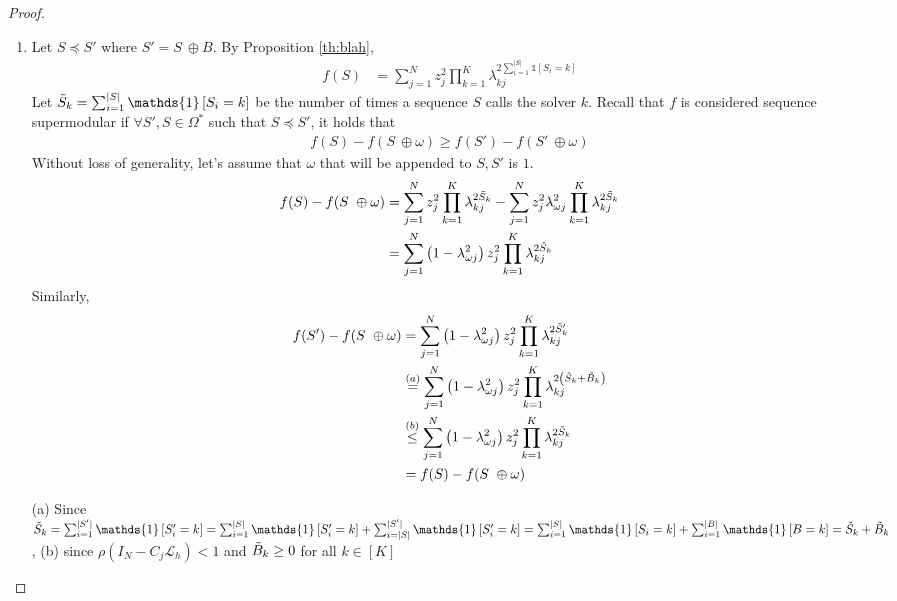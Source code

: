\documentclass[12pt]{article}
\begin{document}
\begin{proof}
\begin{enumerate}
\item[(ii)] Let $S \preceq S'$ where $S' = S \ \oplus B$. By Proposition \ref{th:blah},
\begin{align*}
    f(S) &= \sum_{j = 1}^N z_j^2 \prod_{k = 1}^K \lambda_{kj}^{2\sum_{i = 1}^{|S|} \mathds{1}\left[S_i = k\right]}
\end{align*}
Let $\Tilde{S}_k = \sum_{i = 1}^{|S|} \mathds{1}\left[S_i = k\right]$ be the number of times a sequence $S$ calls the solver $k$. Recall that $f$ is considered sequence supermodular if $\forall S', S \in \Omega^*$ such that $S \preceq S'$, it holds that
\begin{align*}
    f(S) - f(S \ \oplus \omega ) \geq f(S') - f(S' \ \oplus \omega )
\end{align*}
Without loss of generality, let's assume that $\omega$ that will be appended to $S, S'$ is $1$.
\begin{align*}
    f(S) - f(S \ \oplus \omega) &= \sum_{j = 1}^N z_j^2 \prod_{k = 1}^K \lambda_{kj}^{2\Tilde{S}_k} - \sum_{j = 1}^N z_j^2 \lambda_{\omega j}^{2}\prod_{k = 1}^K \lambda_{kj}^{2\Tilde{S}_k} \\
    &=  \sum_{j = 1}^N \left(1 - \lambda_{\omega j}^2\right) z_j^2 \prod_{k = 1}^K \lambda_{kj}^{2\Tilde{S}_k}
\end{align*}
Similarly, 
\begin{align*}
    f(S') - f(S \ \oplus \omega) &= \sum_{j = 1}^N \left(1 - \lambda_{\omega j}^2\right) z_j^2 \prod_{k = 1}^K \lambda_{kj}^{2\Tilde{S}'_k} \\
    &\overset{(a)}{=}  \sum_{j = 1}^N \left(1 - \lambda_{\omega j}^2\right) z_j^2 \prod_{k = 1}^K \lambda_{kj}^{2\left(\Tilde{S}_k + \Tilde{B}_k\right)} \\
    &\overset{(b)}{\leq } \sum_{j = 1}^N \left(1 - \lambda_{\omega j}^2\right) z_j^2 \prod_{k = 1}^K \lambda_{kj}^{2\Tilde{S}_k} \\
    &= f(S) - f(S \ \oplus \omega)
\end{align*}


(a) Since $\Tilde{S}_k = \sum_{i = 1}^{|S'|} \mathds{1}\left[S_i' = k\right] = \sum_{i = 1}^{|S|} \mathds{1}\left[S_i' = k\right] + \sum_{i = |S|}^{|S'|} \mathds{1}\left[S_i' = k\right] = \sum_{i = 1}^{|S|} \mathds{1}\left[S_i = k\right] + \sum_{i = 1}^{|B|} \mathds{1}\left[B = k\right] = \Tilde{S}_k + \Tilde{B}_k$, (b) since $\rho(I_N - C_j \mathcal{L}_h) < 1$ and $\Tilde{B}_k \geq 0$ for all $k \in [K]$


\end{enumerate}


\end{proof}
\end{document}

